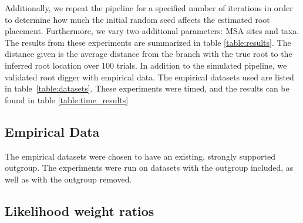 \documentclass{article}
\begin{document}
Additionally, we repeat the pipeline for a specified number of iterations in
order to determine how much the initial random seed affects the estimated root
placement.
Furthermore, we vary two additional parameters: MSA sites and taxa.
The results from these experiments are summarized in table \ref{table:results}.
The distance given is the average distance from the branch with the true root
to the inferred root location over 100 trials.
In addition to the simulated pipeline, we validated root digger with empirical
data.
The empirical datasets used are listed in table~\ref{table:datasets}.
These experiments were timed, and the results can be found in table
\ref{table:time_results} 

\begin{table} \begin{center}  \label{table:results}
  \end{center} \end{table} 

\begin{table} \begin{center} 
    \label{table:time_results} \end{center} \end{table} 

\subsection{Empirical Data} 

The empirical datasets were chosen to have an existing, strongly supported
outgroup.
The experiments were run on datasets with the outgroup included, as well as
with the outgroup removed.

\begin{table}[H]
  \begin{center}
    
    \label{table:datasets}
  \end{center}
\end{table}

\begin{table}
  \begin{center}
    
    \label{table:emperical_results}
  \end{center}
\end{table}

\subsection{Likelihood weight ratios}
\end{document}
